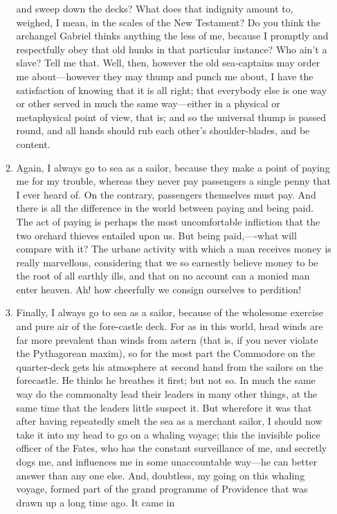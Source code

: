 \documentclass{armymemo}
\begin{document}
\begin{enumerate}
\begin{enumerate}
    and sweep down the decks? What does that indignity amount to, weighed, I
    mean, in the scales of the New Testament? Do you think the archangel Gabriel
    thinks anything the less of me, because I promptly and respectfully obey
    that old hunks in that particular instance? Who ain’t a slave? Tell me
    that. Well, then, however the old sea-captains may order me about—however
    they may thump and punch me about, I have the satisfaction of knowing that
    it is all right; that everybody else is one way or other served in much the
    same way—either in a physical or metaphysical point of view, that is; and so
    the universal thump is passed round, and all hands should rub each other’s
    shoulder-blades, and be content.
  \item Again, I always go to sea as a sailor, because they make a point of
    paying me for my trouble, whereas they never pay passengers a single penny
    that I ever heard of. On the contrary, passengers themselves must pay. And
    there is all the difference in the world between paying and being paid. The
    act of paying is perhaps the most uncomfortable infliction that the two
    orchard thieves entailed upon us. But being paid,—-what will compare with
    it? The urbane activity with which a man receives money is really
    marvellous, considering that we so earnestly believe money to be the root of
    all earthly ills, and that on no account can a monied man enter heaven. Ah!
    how cheerfully we consign ourselves to perdition!
  \item Finally, I always go to sea as a sailor, because of the wholesome
    exercise and pure air of the fore-castle deck. For as in this world, head
    winds are far more prevalent than winds from astern (that is, if you never
    violate the Pythagorean maxim), so for the most part the Commodore on the
    quarter-deck gets his atmosphere at second hand from the sailors on the
    forecastle. He thinks he breathes it first; but not so. In much the same way
    do the commonalty lead their leaders in many other things, at the same time
    that the leaders little suspect it. But wherefore it was that after having
    repeatedly smelt the sea as a merchant sailor, I should now take it into my
    head to go on a whaling voyage; this the invisible police officer of the
    Fates, who has the constant surveillance of me, and secretly dogs me, and
    influences me in some unaccountable way—he can better answer than any one
    else. And, doubtless, my going on this whaling voyage, formed part of the
    grand programme of Providence that was drawn up a long time ago. It came in

\end{enumerate}
\end{enumerate}
\end{document}
